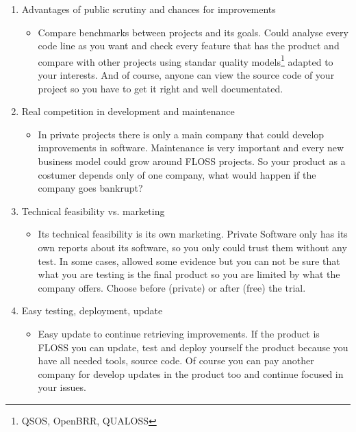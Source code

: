 \documentclass[11pt]{scrartcl}
\begin{document}
\begin{enumerate}

    \item Advantages of public scrutiny and chances for improvements
    \begin{itemize}
        \item Compare benchmarks between projects and its goals. Could analyse every code line as you want and check every feature that has the product and compare with other projects using standar quality models\footnote{QSOS, OpenBRR, QUALOSS} adapted to your interests. And of course, anyone can view the source code of your project so you have to get it right and well documentated.
    \end{itemize}

    \item Real competition in development and maintenance
    \begin{itemize}
        \item In private projects there is only a main company that could develop improvements in software. Maintenance is very important and every new business model could grow around FLOSS projects. So your product as a costumer depends only of one company, what would happen if the company goes bankrupt?
    \end{itemize}

    \item Technical feasibility vs. marketing
    \begin{itemize}
        \item Its technical feasibility is its own marketing. Private Software only has its own reports about its software, so you only could trust them without any test. In some cases, allowed some evidence but you can not be sure that what you are testing is the final product so you are limited by what the company offers. Choose before (private) or after (free) the trial.
    \end{itemize}

    \item Easy testing, deployment, update
    \begin{itemize}
        \item Easy update to continue retrieving improvements. If the product is FLOSS you can update, test and deploy yourself the product because you have all needed tools, source code. Of course you can pay another company for develop updates in the product too and continue focused in your issues.
    \end{itemize}


\end{enumerate}
\end{document}
